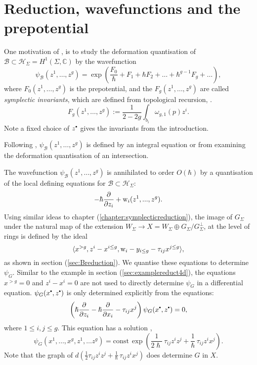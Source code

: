     
    
    \section{Reduction, wavefunctions and the prepotential}
    
    One motivation of \cite{ks_airy}, is to study the deformation quantisation of \( \mathcal{B} \subset \mathcal{H}_\Sigma = H^1(\Sigma, \mathbb{C}) \) by the wavefunction
    \[\psi_{\mathcal{B}}(z^1, \dots , z^g) = \exp\left(\frac{F_0}{\hbar}+F_1+\hbar F_2+\dots +\hbar^{g-1}F_g+\dots\right),
    \]
    where \(F_0(z^1, \dots , z^g)\) is the prepotential, and the \(F_g(z^1, \dots , z^g)\) are called \emph{symplectic invariants}, which are defined from topological recursion, \cite{chaimanowong2020airy}. 
    \[  F_g(z^1, \dots , z^g) :=\frac{1}{2-2g}\int_{b_i}\omega_{g,1}(p) z^i. \]
    Note a fixed choice of \(z^{\sbt}\) gives the invariants from the introduction.
    
    Following \cite{ks_airy},  \(\psi_{\mathcal{B}}(z^1, \dots, z^g)\) is defined by an integral equation or from examining the deformation quantisation of an intersection.
    
    The wavefunction \( \psi_{\mathcal{B}}(z^1, \dots, z^g)\) is annihilated to order \( O(\hbar)\) by a quantisation of the local defining equations for \( \mathcal{B} \subset \mathcal{H}_\Sigma \):
    \[ -\hbar\frac{\partial}{\partial z_i}+\mathrm{w}_i(z^1,...,z^g).\] 
    Using similar ideas to chapter (\ref{chapter:symplecticreduction}), the image of \(G_\Sigma\) under the natural map of the extension \(W_\Sigma \rightarrow X =  W_\Sigma \oplus G_\Sigma / G_\Sigma^{\perp}\), at the level of rings is defined by the ideal
    \[    \langle x^{>g}, z^i - x^{i \leq g}, \mathrm{w}_i - y_{i\leq g}-\tau_{ij}x^{j \leq g} \rangle, \]
    as shown in section (\ref{sec:Breduction}). We quantise these equations to determine \( \psi_G\). Similar to the example in section (\ref{sec:examplereduct4d}), the equations \(x^{>g}=0\) and \(z^i - x^i=0\) are not used to directly determine \( \psi_G\) in a differential equation. \(\psi_G(x^{\sbt},z^{\sbt})\) is only determined explicitly from the equations:
    \[\left( \hslash \frac{\partial}{\partial z_i} - \hslash \frac{\partial}{\partial x_i } - \tau_{ij} x^j \right) \psi_G(x^{\sbt},z^{\sbt}) = 0, \]
    where \( 1 \leq i, j \leq g\). This equation has a solution 
,    \[ \psi_G(x^1, \dots ,x^g, z^1,\dots z^g ) = \mathrm{const} \, \exp\left( \frac{1}{2 \hslash}\, \tau_{ij} z^i z^j +  \frac{1}{\hslash} \, \tau_{ij} z^i x^j  \right). \]
    Note that the graph of \( d \left( \frac{1}{2} \tau_{ij} z^i z^j +  \frac{1}{\hslash} \, \tau_{ij} z^i x^j \right)\) does determine \(G\) in \(X\). 

